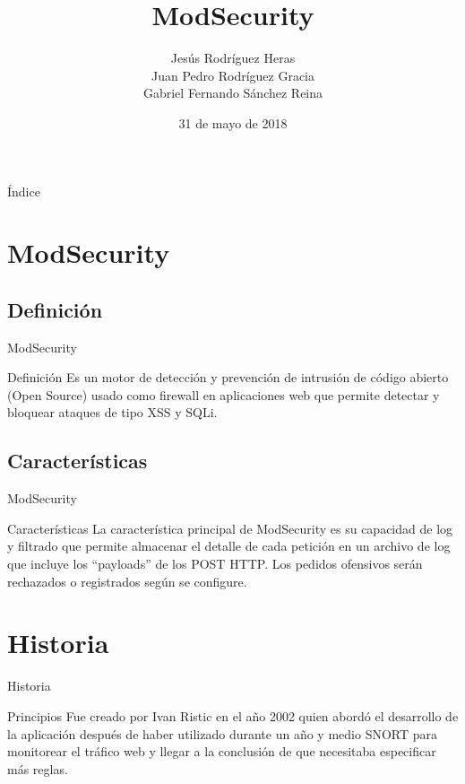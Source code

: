 \documentclass{beamer}
\title{ModSecurity}
\author{Jesús Rodríguez Heras \\ Juan Pedro Rodríguez Gracia \\ Gabriel Fernando Sánchez Reina}
\date{31 de mayo de 2018}
\begin{document}
\begin{frame}
  \titlepage
  
\end{frame}

\begin{frame}{Índice}
  \tableofcontents
\end{frame}


\section{ModSecurity}
\subsection{Definición}
\begin{frame}{ModSecurity}
	\begin{block}{Definición}
		Es un motor de detección y prevención de intrusión de código abierto (Open Source) usado como firewall en aplicaciones web que permite detectar y bloquear ataques de tipo XSS y SQLi.
	\end{block}
\end{frame}

\subsection{Características}
\begin{frame}{ModSecurity}
\begin{block}{Características}
	La característica principal de ModSecurity es su capacidad de log y filtrado que permite almacenar el detalle de cada petición en un archivo de log que incluye los ``payloads'' de los POST HTTP. Los pedidos ofensivos serán rechazados o registrados según se configure.
\end{block}
\end{frame}

\section{Historia}
\begin{frame}{Historia}
	\begin{block}{Principios}
		Fue creado por Ivan Ristic en el año 2002 quien abordó el desarrollo de la aplicación después de haber utilizado durante un año y medio SNORT para monitorear el tráfico web y llegar a la conclusión de que necesitaba especificar más reglas.
	\end{block}
\end{frame}
\end{document}
